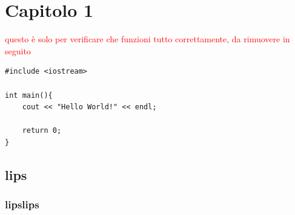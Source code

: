 \chapter{Capitolo 1}

\textcolor{red}{questo è solo per verificare che funzioni tutto correttamente, da rimuovere in seguito} \cite{Einstein1905}

\begin{verbatim}
#include <iostream>

int main(){
    cout << "Hello World!" << endl;

    return 0;
}
\end{verbatim}

\lipsum[1]

\section{lips}
\lipsum[2-4]

\subsection{lipslips}
\lipsum[5]